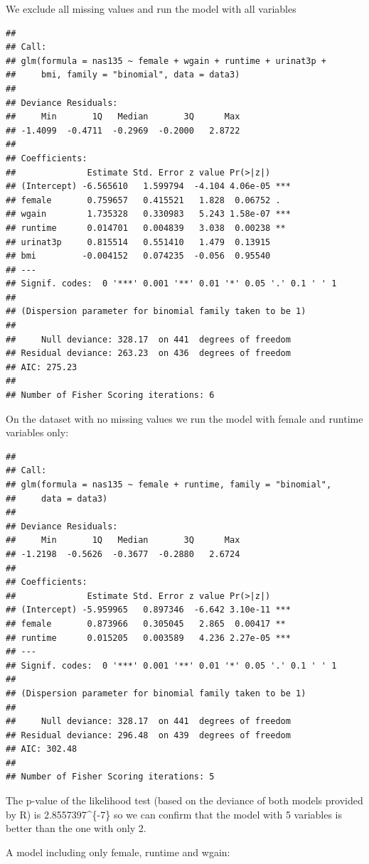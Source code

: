 \documentclass[]{article}
\begin{document}
We exclude all missing values and run the model with all variables

\begin{verbatim}
## 
## Call:
## glm(formula = nas135 ~ female + wgain + runtime + urinat3p + 
##     bmi, family = "binomial", data = data3)
## 
## Deviance Residuals: 
##     Min       1Q   Median       3Q      Max  
## -1.4099  -0.4711  -0.2969  -0.2000   2.8722  
## 
## Coefficients:
##              Estimate Std. Error z value Pr(>|z|)    
## (Intercept) -6.565610   1.599794  -4.104 4.06e-05 ***
## female       0.759657   0.415521   1.828  0.06752 .  
## wgain        1.735328   0.330983   5.243 1.58e-07 ***
## runtime      0.014701   0.004839   3.038  0.00238 ** 
## urinat3p     0.815514   0.551410   1.479  0.13915    
## bmi         -0.004152   0.074235  -0.056  0.95540    
## ---
## Signif. codes:  0 '***' 0.001 '**' 0.01 '*' 0.05 '.' 0.1 ' ' 1
## 
## (Dispersion parameter for binomial family taken to be 1)
## 
##     Null deviance: 328.17  on 441  degrees of freedom
## Residual deviance: 263.23  on 436  degrees of freedom
## AIC: 275.23
## 
## Number of Fisher Scoring iterations: 6
\end{verbatim}

On the dataset with no missing values we run the model with female and
runtime variables only:

\begin{verbatim}
## 
## Call:
## glm(formula = nas135 ~ female + runtime, family = "binomial", 
##     data = data3)
## 
## Deviance Residuals: 
##     Min       1Q   Median       3Q      Max  
## -1.2198  -0.5626  -0.3677  -0.2880   2.6724  
## 
## Coefficients:
##              Estimate Std. Error z value Pr(>|z|)    
## (Intercept) -5.959965   0.897346  -6.642 3.10e-11 ***
## female       0.873966   0.305045   2.865  0.00417 ** 
## runtime      0.015205   0.003589   4.236 2.27e-05 ***
## ---
## Signif. codes:  0 '***' 0.001 '**' 0.01 '*' 0.05 '.' 0.1 ' ' 1
## 
## (Dispersion parameter for binomial family taken to be 1)
## 
##     Null deviance: 328.17  on 441  degrees of freedom
## Residual deviance: 296.48  on 439  degrees of freedom
## AIC: 302.48
## 
## Number of Fisher Scoring iterations: 5
\end{verbatim}

The p-value of the likelihood test (based on the deviance of both models
provided by R) is 2.8557397\^{}\{-7\} so we can confirm that
the model with 5 variables is better than the one with only 2.

A model including only female, runtime and wgain:
\end{document}
